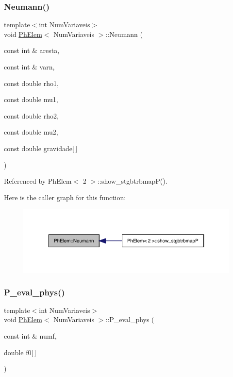 \subsubsection{\texorpdfstring{Neumann()}{Neumann()}}
{\footnotesize\ttfamily template$<$int Num\+Variaveis$>$ \\
void \hyperlink{classPhElem}{Ph\+Elem}$<$ Num\+Variaveis $>$\+::Neumann (\begin{DoxyParamCaption}\item[{const int \&}]{aresta,  }\item[{const int \&}]{varn,  }\item[{const double}]{rho1,  }\item[{const double}]{mu1,  }\item[{const double}]{rho2,  }\item[{const double}]{mu2,  }\item[{const double}]{gravidade\mbox{[}$\,$\mbox{]} }\end{DoxyParamCaption})}



Referenced by Ph\+Elem$<$ 2 $>$\+::show\+\_\+stgbtrbmap\+P().

Here is the caller graph for this function\+:
\nopagebreak
\begin{figure}[H]
\begin{center}
\leavevmode
\includegraphics[width=323pt]{classPhElem_a857f4ffbef27f0ef054f59eceffbad27_icgraph}
\end{center}
\end{figure}
\mbox{\label{classPhElem_a638d823f66d1600cb948df872eb753c1}} 
\subsubsection{\texorpdfstring{P\+\_\+eval\+\_\+phys()}{P\_eval\_phys()}}
{\footnotesize\ttfamily template$<$int Num\+Variaveis$>$ \\
void \hyperlink{classPhElem}{Ph\+Elem}$<$ Num\+Variaveis $>$\+::P\+\_\+eval\+\_\+phys (\begin{DoxyParamCaption}\item[{const int \&}]{numf,  }\item[{double}]{f0\mbox{[}$\,$\mbox{]} }\end{DoxyParamCaption})}



